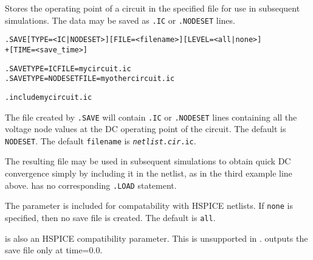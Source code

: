 



 
Stores the operating point of a circuit in the specified file for use in subsequent simulations.  The data may be saved as \texttt{.IC} or \texttt{.NODESET} lines.

\begin{Command}

\format
\begin{alltt}
.SAVE [TYPE=<IC|NODESET>] [FILE=<filename>] [LEVEL=<all|none>]
+ [TIME=<save\_time>]
\end{alltt}

\examples
\begin{alltt}
.SAVE TYPE=IC FILE=mycircuit.ic
.SAVE TYPE=NODESET FILE=myothercircuit.ic

.include mycircuit.ic
\end{alltt}

\comments

  The file created by \texttt{.SAVE} will contain \texttt{.IC} or
  \texttt{.NODESET} lines containing all the voltage node values at the DC
  operating point of the circuit. The default  is
  \texttt{NODESET}. The default \texttt{filename} is
  \texttt{\emph{netlist.cir}.ic}.
  
  The resulting file may be used in subsequent simulations to obtain quick DC
  convergence simply by including it in the netlist, as in the third example
  line above.  \Xyce{} has no corresponding \texttt{.LOAD} statement.
  
  The  parameter is included for compatability with HSPICE
  netlists. If \texttt{none} is specified, then no save file is created. The
  default  is \texttt{all}.
  
   is also an HSPICE compatibility parameter. This is unsupported
  in \Xyce{}. \Xyce{} outputs the save file only at time=0.0.

\end{Command}

